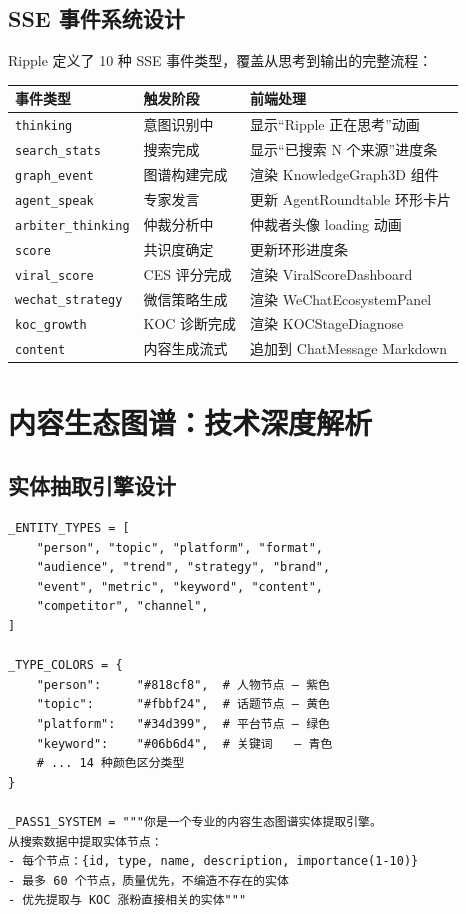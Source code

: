 \documentclass[12pt,a4paper]{ctexart}
\begin{document}
\subsection{SSE 事件系统设计}

Ripple 定义了 10 种 SSE 事件类型，覆盖从思考到输出的完整流程：

\begin{center}
{\small
\begin{tabular}{p{3.5cm} p{2.5cm} >{\raggedright\arraybackslash}p{7cm}}
\toprule
\textbf{事件类型} & \textbf{触发阶段} & \textbf{前端处理} \\
\midrule
\texttt{thinking} & 意图识别中 & 显示``Ripple 正在思考''动画 \\[2pt]
\texttt{search\_stats} & 搜索完成 & 显示``已搜索 N 个来源''进度条 \\[2pt]
\texttt{graph\_event} & 图谱构建完成 & 渲染 KnowledgeGraph3D 组件 \\[2pt]
\texttt{agent\_speak} & 专家发言 & 更新 AgentRoundtable 环形卡片 \\[2pt]
\texttt{arbiter\_thinking} & 仲裁分析中 & 仲裁者头像 loading 动画 \\[2pt]
\texttt{score} & 共识度确定 & 更新环形进度条 \\[2pt]
\texttt{viral\_score} & CES 评分完成 & 渲染 ViralScoreDashboard \\[2pt]
\texttt{wechat\_strategy} & 微信策略生成 & 渲染 WeChatEcosystemPanel \\[2pt]
\texttt{koc\_growth} & KOC 诊断完成 & 渲染 KOCStageDiagnose \\[2pt]
\texttt{content} & 内容生成流式 & 追加到 ChatMessage Markdown \\
\bottomrule
\end{tabular}
}
\end{center}


\section{内容生态图谱：技术深度解析}

\subsection{实体抽取引擎设计}

\begin{lstlisting}[style=pycode,caption={engines/graph\_builder.py — 14 类实体抽取}]
_ENTITY_TYPES = [
    "person", "topic", "platform", "format",
    "audience", "trend", "strategy", "brand",
    "event", "metric", "keyword", "content",
    "competitor", "channel",
]

_TYPE_COLORS = {
    "person":     "#818cf8",  # 人物节点 — 紫色
    "topic":      "#fbbf24",  # 话题节点 — 黄色
    "platform":   "#34d399",  # 平台节点 — 绿色
    "keyword":    "#06b6d4",  # 关键词   — 青色
    # ... 14 种颜色区分类型
}

_PASS1_SYSTEM = """你是一个专业的内容生态图谱实体提取引擎。
从搜索数据中提取实体节点：
- 每个节点：{id, type, name, description, importance(1-10)}
- 最多 60 个节点，质量优先，不编造不存在的实体
- 优先提取与 KOC 涨粉直接相关的实体"""
\end{lstlisting}
\end{document}
